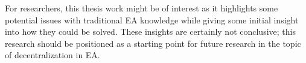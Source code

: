 For researchers, this thesis work might be of interest as it highlights some potential issues with traditional EA knowledge while giving some initial insight into how they could be solved. These insights are certainly not conclusive; this research should be positioned as a starting point for future research in the topic of decentralization in EA. 
